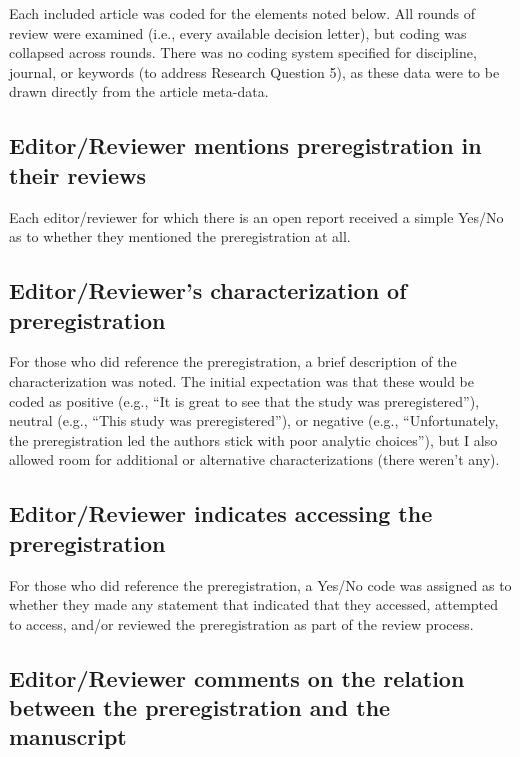 \documentclass[authordate, meta]{jote-new-article}
\begin{document}
	Each included article was coded for the elements noted below. All rounds of review were examined (i.e., every available decision letter), but coding was collapsed across rounds. There was no coding system specified for discipline, journal, or keywords (to address Research Question 5), as these data were to be drawn directly from the article meta-data.



	\subsection{Editor/Reviewer mentions preregistration in their reviews}



	Each editor/reviewer for which there is an open report received a simple Yes/No as to whether they mentioned the preregistration at all.



	\subsection{Editor/Reviewer's characterization of preregistration}



	For those who did reference the preregistration, a brief description of the characterization was noted. The initial expectation was that these would be coded as positive (e.g., “It is great to see that the study was preregistered”), neutral (e.g., “This study was preregistered”), or negative (e.g., “Unfortunately, the preregistration led the authors stick with poor analytic choices”), but I also allowed room for additional or alternative characterizations (there weren't any).



	\subsection{Editor/Reviewer indicates accessing the preregistration }



	For those who did reference the preregistration, a Yes/No code was assigned as to whether they made any statement that indicated that they accessed, attempted to access, and/or reviewed the preregistration as part of the review process.



	\subsection{Editor/Reviewer comments on the relation between the preregistration and the manuscript}
\end{document}
